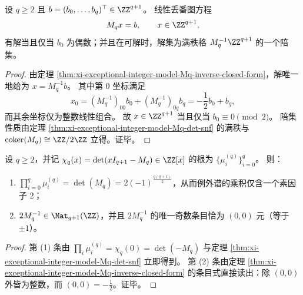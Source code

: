 \begin{corollary}\label{cor:xi-exceptional-integer-model-Mq-diophantine-parity}
设 \(q\ge 2\) 且 \(b=(b_0,\dots,b_q)^{\top}\in\ZZ^{q+1}\)。
线性丢番图方程
\[
M_qx=b,\qquad x\in\ZZ^{q+1},
\]
有解当且仅当 \(b_0\) 为偶数；并且在可解时，解集为满秩格 \(M_q^{-1}\ZZ^{q+1}\) 的一个陪集。
\end{corollary}
\begin{proof}
由定理 \ref{thm:xi-exceptional-integer-model-Mq-inverse-closed-form}，解唯一地给为 \(x=M_q^{-1}b\)。
其中第 \(0\) 坐标满足
\[
x_0=(M_q^{-1})_{00}b_0+(M_q^{-1})_{0q}b_q=-\frac12 b_0+b_q,
\]
而其余坐标仅为整数线性组合。
故 \(x\in\ZZ^{q+1}\) 当且仅当 \(b_0\equiv 0\pmod 2\)。
陪集性质由定理 \ref{thm:xi-exceptional-integer-model-Mq-det-snf} 的满秩与 \(\mathrm{coker}(M_q)\cong\ZZ/2\ZZ\) 立得。证毕。
\end{proof}

\begin{corollary}\label{cor:xi-exceptional-integer-model-Mq-single-denominator-defect}
设 \(q\ge 2\)，并记 \(\chi_q(x)=\det(xI_{q+1}-M_q)\in\ZZ[x]\) 的根为 \(\{\mu_i^{(q)}\}_{i=0}^{q}\)。
则：
\begin{enumerate}
  \item \(\prod_{i=0}^{q}\mu_i^{(q)}=\det(M_q)=2(-1)^{\frac{q(q+1)}{2}}\)，从而例外谱的乘积仅含一个素因子 \(2\)；
  \item \(2M_q^{-1}\in\Mat_{q+1}(\ZZ)\)，并且 \(2M_q^{-1}\) 的唯一奇数条目恰为 \((0,0)\) 元（等于 \(\pm1\)）。
\end{enumerate}
\end{corollary}
\begin{proof}
第 (1) 条由 \(\prod_i\mu_i^{(q)}=\chi_q(0)=\det(-M_q)\) 与定理 \ref{thm:xi-exceptional-integer-model-Mq-det-snf} 立即得到。
第 (2) 条由定理 \ref{thm:xi-exceptional-integer-model-Mq-inverse-closed-form} 的条目式直接读出：除 \((0,0)\) 外皆为整数，而 \((0,0)=-\tfrac12\)。证毕。
\end{proof}

